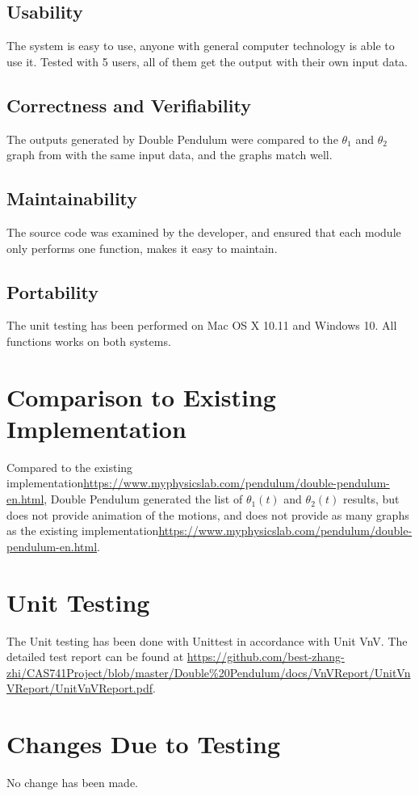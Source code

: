 \documentclass[12pt, titlepage]{article}
\begin{document}
\subsection{Usability}
The system is easy to use, anyone with general computer technology is able to use it. Tested with 5 users, all of them get the output with their own input data. 

\subsection{Correctness and Verifiability}
The outputs generated by Double Pendulum were compared to the $\theta_1$ and $\theta_2$ graph from \cite{Double_Pendulum} with the same input data, and the graphs match well. 

\subsection{Maintainability}
The source code was examined by the developer, and ensured that each module only performs one function, makes it easy to maintain.  


\subsection{Portability}
The unit testing has been performed on Mac OS X 10.11 and Windows 10. All functions works on both systems.
	
\section{Comparison to Existing Implementation}	
Compared to the existing implementation\url{https://www.myphysicslab.com/pendulum/double-pendulum-en.html}, Double Pendulum generated the list of $\theta_1(t)$ and $\theta_2(t)$ results, but does not provide animation of the motions, and does not provide as many graphs as the existing implementation\url{https://www.myphysicslab.com/pendulum/double-pendulum-en.html}. 

\section{Unit Testing}
The Unit testing has been done with Unittest in accordance with Unit VnV. The detailed test report can be found at \url{https://github.com/best-zhang-zhi/CAS741Project/blob/master/Double%20Pendulum/docs/VnVReport/UnitVnVReport/UnitVnVReport.pdf}. 

\section{Changes Due to Testing}
No change has been made. 
\end{document}
